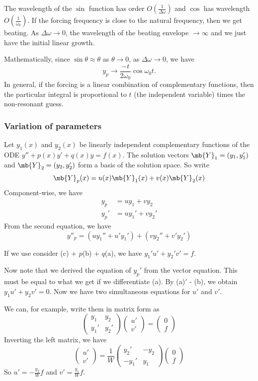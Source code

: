 \documentclass[a4paper]{article}
\begin{document}
The wavelength of the $\sin$ function has order $O(\frac{1}{\Delta \omega})$ and $\cos$ has wavelength $O(\frac{1}{\omega_0})$. If the forcing frequency is close to the natural frequency, then we get beating. As $\Delta\omega\to 0$, the wavelength of the beating envelope $\to \infty$ and we just have the initial linear growth.

Mathematically, since $\sin\theta \approx \theta$ as $\theta \to 0$, as $\Delta\omega \to 0$, we have
\[
y_p\to \frac{-t}{2\omega_0}\cos\omega_0 t.
\]
In general, if the forcing is a linear combination of complementary functions, then the particular integral is proportional to $t$ (the independent variable) times the non-resonant guess.

\subsubsection{Variation of parameters}
Let $y_1(x)$ and $y_2(x)$ be linearly independent complementary functions of the ODE $y'' + p(x)y' + q(x)y = f(x)$. The solution vectors $\mb{Y}_1 = (y_1, y_1')$ and $\mb{Y}_2 = (y_2, y_2')$ form a basis of the solution space. So write
\[
\mb{Y}_p(x) = u(x)\mb{Y}_1(x) + v(x)\mb{Y}_2(x)
\]
Component-wise, we have 
\begin{align*}
  y_p &= uy_1 + vy_2 \tag{a}\\
  y_p' &= uy_1' + vy_2' \tag{b}
\end{align*}
From the second equation, we have
\[
y''_p  = (uy_1'' + u'y_1') + (vy_2'' + v'y_2') \tag{c}
\]

If we use consider (c) + $p$(b) + $q$(a), we have $y_1' u' + y_2'v' = f$.

Now note that we derived the equation of $y_p'$ from the vector equation. This must be equal to what we get if we differentiate (a). By (a)$'$ - (b), we obtain $y_1u' + y_2v' = 0$. Now we have two simultaneous equations for $u'$ and $v'$.

We can, for example, write them in matrix form as
\[
\begin{pmatrix}
  y_1 & y_2\\
  y_1' & y_2'
\end{pmatrix}
\begin{pmatrix}
  u'\\
  v'
\end{pmatrix}
=
\begin{pmatrix}
  0\\
  f
\end{pmatrix}
\]
Inverting the left matrix, we have
\[
\begin{pmatrix}
  u'\\
  v'
\end{pmatrix} = \frac{1}{W}
\begin{pmatrix}
  y_2' & -y_2\\
  -y_1' & y_1
\end{pmatrix}
\begin{pmatrix}
  0\\f
\end{pmatrix}
\]
So $u' = -\frac{y_2}{W}f$ and $v' = \frac{y_1}{W}f$.
\end{document}
